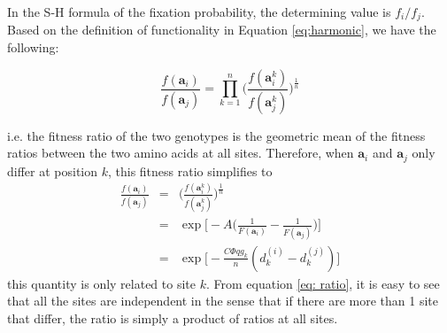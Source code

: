 \documentclass[13pt]{article}
\begin{document}
%
%




In the S-H formula of the fixation probability, the determining value is $f_i/f_j$.
Based on the definition of functionality in Equation \ref{eq:harmonic}, we have the following:

\begin{equation}
\frac{f(\mathbf{a}_i)}{f(\mathbf{a}_j)} = \prod_{k=1}^n\Big( \frac{f(\mathbf{a}_i^k)}{f(\mathbf{a}_j^k)}\Big)^{\frac{1}{n}}
\end{equation}


i.e. the fitness ratio of the two genotypes is the geometric mean of the fitness ratios between the two amino acids at all sites. Therefore, when $\mathbf{a}_i$ and $\mathbf{a}_j$ only differ at position $k$, this fitness ratio simplifies to  
\begin{eqnarray}
\frac{f(\mathbf{a}_i)}{f(\mathbf{a}_j)} & = & \Big( \frac{f(\mathbf{a}_i^k)}{f(\mathbf{a}_j^k)}\Big)^{\frac{1}{n}}\\
 & = &\exp \Big[-A\Big( \frac{1}{F(\mathbf{a}_i )} - \frac{1}{F(\mathbf{a}_j )}\Big)\Big] \nonumber\\
& = & \exp\Big[ -\frac{C\Phi q g_k}{n}(d_k^{(i)} - d_k^{(j)})\Big] \label{eq: ratio}
\end{eqnarray}
\noindent
this quantity is only related to site $k$. From equation \ref{eq: ratio}, it is easy to see that all the sites are independent in the sense that if there are more than 1 site that differ, the ratio is simply a product of ratios at all sites. \\
\end{document}
